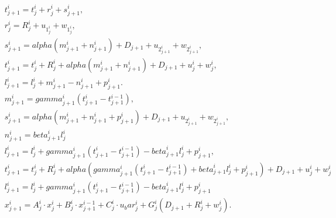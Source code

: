\begin{align}
  &  t_{j + 1}^{i} = t_{j}^{i} + r_{j}^{i} + s_{j + 1}^{i} ,  \tag{eq\_0001} \\
  &  r_{j}^{i} = R_{j}^{i} + u_{1}_{j}^{i} + w_{1}_{j}^{i} ,  \tag{eq\_0002} \\
  &  s_{j + 1}^{i} = \mathit{alpha} \left(m_{j + 1}^{i} + n_{j + 1}^{i}\right) + D_{j + 1} + u_{2}_{j + 1}^{i} + w_{2}_{j + 1}^{i} ,  \tag{eq\_0003} \\
  &  t_{j + 1}^{i} = t_{j}^{i} + R_{j}^{i} + \mathit{alpha} \left(m_{j + 1}^{i} + n_{j + 1}^{i}\right) + D_{j + 1} + u_{j}^{i} + w_{j}^{i} ,  \tag{eq\_0004} \\
  &  l_{j + 1}^{i} = l_{j}^{i} + m_{j + 1}^{i} - n_{j + 1}^{i} + p_{j + 1}^{i} .  \tag{eq\_0005} \\
  &  m_{j + 1}^{i} = \mathit{gamma}_{j + 1}^{i} \left(t_{j + 1}^{i} - t_{j + 1}^{i - 1}\right) ,  \tag{eq\_0006} \\
  &  s_{j + 1}^{i} = \mathit{alpha} \left(m_{j + 1}^{i} + n_{j + 1}^{i} + p_{j + 1}^{i}\right) + D_{j + 1} + u_{2}_{j + 1}^{i} + w_{2}_{j + 1}^{i} ,  \tag{eq\_0007} \\
  &  n_{j + 1}^{i} = \mathit{beta}_{j + 1}^{i} l_{j}^{i}  \tag{eq\_0008} \\
  &  l_{j + 1}^{i} = l_{j}^{i} + \mathit{gamma}_{j + 1}^{i} \left(t_{j + 1}^{i} - t_{j + 1}^{i - 1}\right) - \mathit{beta}_{j + 1}^{i} l_{j}^{i} + p_{j + 1}^{i} ,  \tag{eq\_0009} \\
  & t_{j + 1}^{i} = t_{j}^{i} + R_{j}^{i} + \mathit{alpha} \left(\mathit{gamma}_{j + 1}^{i} \left(t_{j + 1}^{i} - t_{j + 1}^{i - 1}\right) + \mathit{beta}_{j + 1}^{i} l_{j}^{i} + p_{j + 1}^{i}\right) + D_{j + 1} + u_{j}^{i} + w_{j}^{i} \tag{eq\_0010\_a} \\
  & l_{j + 1}^{i} = l_{j}^{i} + \mathit{gamma}_{j + 1}^{i} \left(t_{j + 1}^{i} - t_{j + 1}^{i - 1}\right) - \mathit{beta}_{j + 1}^{i} l_{j}^{i} + p_{j + 1}^{i} \tag{eq\_0010\_b} \\
  &  x_{j + 1}^{i} = A_{j}^{i} \cdot x_{j}^{i} + B_{j}^{i} \cdot x_{j + 1}^{i - 1} + C_{j}^{i} \cdot u_bar_{j}^{i} + G_{j}^{i} \left(D_{j + 1} + R_{j}^{i} + w_{j}^{i}\right) .  \tag{eq\_0011} \\

\end{align}
